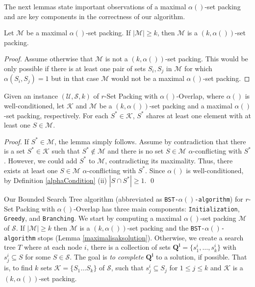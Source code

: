 The next lemmas state important observations of a maximal $\alpha()$-set packing and are key components in the correctness of our algorithm.

\begin{lemma}\label{maximalisaksolution}
Let $\mathcal{M}$ be a maximal $\alpha()$-set packing. If $|\mathcal{M}|\geq k$, then $\mathcal{M}$ is a $(k,\alpha())$-set packing.
\end{lemma}

\begin{proof}
Assume otherwise that $\mathcal{M}$ is not a $(k,\alpha())$-set packing. This would be only possible if there is at least one pair of sets $S_i,S_j$ in $\mathcal{M}$ for which $\alpha(S_i,S_j)=1$ but in that case $\mathcal{M}$ would not be a  maximal $\alpha()$-set packing. 
\end{proof}

\begin{lemma}\label{intersectionLemma}
Given an instance $(\mathcal{U},\mathcal{S},k)$ of $r$-Set Packing with $\alpha()$-Overlap, where $\alpha()$ is well-conditioned, let $\mathcal{K}$ and $\mathcal{M}$ be a $(k,\alpha())$-set packing and a maximal $\alpha()$-set packing, respectively. 
For each $S^* \in \mathcal{K}$, $S^*$ shares at least one element with at least one $S \in \mathcal{M}$. 
\end{lemma}

\begin{proof}
If $S^* \in \mathcal{M}$, the lemma simply follows. 
Assume by contradiction that there is a set $S^* \in \mathcal{K}$ such that $S^* \notin \mathcal{M}$ and there is no set $S \in \mathcal{M}$ $\alpha$-conflicting with $S^*$. However,  we could add $S^*$ to $\mathcal{M}$, contradicting its maximality. 
Thus, there exists at least one $S \in \mathcal{M}$ $\alpha$-conflicting with $S^*$.
Since $\alpha()$ is well-conditioned, by Definition \ref{alphaCondition} (ii) $|S \cap S^*| \geq 1$. \qed
\end{proof}


Our Bounded Search Tree algorithm (abbreviated as \texttt{BST-$\alpha()$-algorithm}) for $r$-Set Packing with $\alpha()$-Overlap has three main components: \texttt{Initialization}, \texttt{Greedy}, and \texttt{Branching}. We start by computing a maximal $\alpha()$-set packing $\mathcal{M}$ of $\mathcal{S}$. If $|\mathcal{M}|\geq k$ then $\mathcal{M}$ is a $(k,\alpha())$-set packing and the \texttt{BST-$\alpha()$-algorithm} stops (Lemma \ref{maximalisaksolution}). Otherwise, we create a search tree $T$ where at each node $i$, there is a collection of sets $\mathbf{Q^i}=\{s^i_1,\dots,s^i_k\}$ with $s^i_j \subseteq S$ for some $S \in \mathcal{S}$. The goal is \emph{to complete} $\mathbf{Q^i}$ to a solution, if possible. That is, to find $k$ sets $\mathcal{K}=\{S_1 \dots S_k\}$ of $\mathcal{S}$, such that $s^i_j \subseteq S_j$ for $1 \leq j \leq k$ and $\mathcal{K}$ is a $(k,\alpha())$-set packing. 

